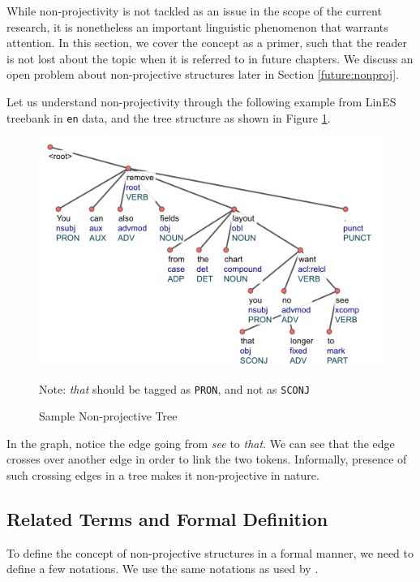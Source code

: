 While non-projectivity is not tackled as an issue in the scope of the current research, it is nonetheless an important linguistic phenomenon that warrants attention. In this section, we cover the concept as a primer, such that the reader is not lost about the topic when it is referred to in future chapters. We discuss an open problem about non-projective structures later in Section \ref{future:nonproj}. 

Let us understand non-projectivity through the following example from LinES treebank in \verb|en| data, and the tree structure as shown in Figure \ref{fig:nonprojdemo}.

\begin{figure}[h]
    \centering
    \includegraphics[scale=0.75]{img/nonproj-demo}
    \caption{Sample Non-projective Tree}
    Note: \textit{that} should be tagged as \texttt{PRON}, and not as \texttt{SCONJ}
    \label{fig:nonprojdemo}
\end{figure}

In the graph, notice the edge going from \textit{see} to \textit{that}. We can see that the edge crosses over another edge in order to link the two tokens. Informally, presence of such crossing edges in a tree makes it non-projective in nature.

\subsection{Related Terms and Formal Definition}

To define the concept of non-projective structures in a formal manner, we need to define a few notations. We use the same notations as used by \cite{mambriniNonProj}.


